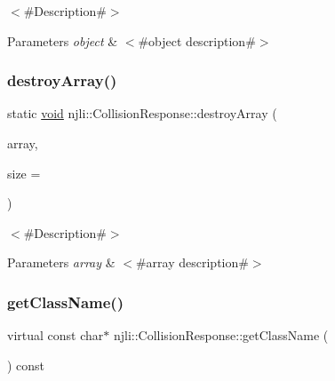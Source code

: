 $<$\#\+Description\#$>$


\begin{DoxyParams}{Parameters}
{\em object} & $<$\#object description\#$>$ \\
\hline
\end{DoxyParams}
\mbox{\label{classnjli_1_1_collision_response_af5733e1bb53053a28251d425217204df}} 
\subsubsection{\texorpdfstring{destroy\+Array()}{destroyArray()}}
{\footnotesize\ttfamily static \mbox{\hyperlink{_thread_8h_af1e856da2e658414cb2456cb6f7ebc66}{void}} njli\+::\+Collision\+Response\+::destroy\+Array (\begin{DoxyParamCaption}\item[{\mbox{\hyperlink{classnjli_1_1_collision_response}{Collision\+Response}} $\ast$$\ast$}]{array,  }\item[{const \mbox{\hyperlink{_util_8h_a10e94b422ef0c20dcdec20d31a1f5049}{u32}}}]{size = {} }\end{DoxyParamCaption})\hspace{0.3cm}{\ttfamily [static]}}

$<$\#\+Description\#$>$


\begin{DoxyParams}{Parameters}
{\em array} & $<$\#array description\#$>$ \\
\hline
\end{DoxyParams}
\mbox{\label{classnjli_1_1_collision_response_a14da55a4e736f5252763942b63d7a768}} 
\subsubsection{\texorpdfstring{get\+Class\+Name()}{getClassName()}}
{\footnotesize\ttfamily virtual const char$\ast$ njli\+::\+Collision\+Response\+::get\+Class\+Name (\begin{DoxyParamCaption}{ }\end{DoxyParamCaption}) const\hspace{0.3cm}{\ttfamily [virtual]}}

